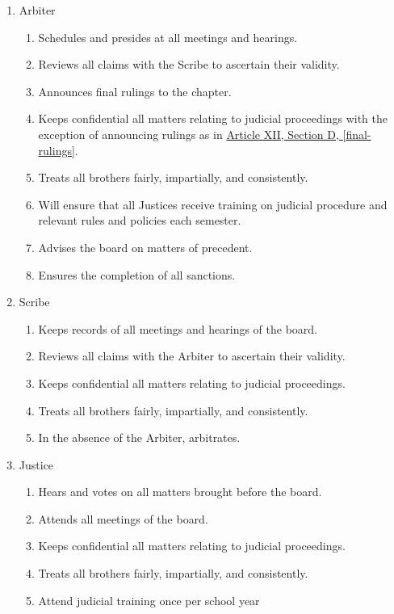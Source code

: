 	\begin{enumerate}

		\item Arbiter
			\begin{enumerate}
				\item Schedules and presides at all meetings and hearings.
				\item Reviews all claims with the Scribe to ascertain their validity.
				\item Announces final rulings to the chapter. \label{final-rulings}
				\item Keeps confidential all matters relating to judicial proceedings with the exception of announcing rulings as in \hyperref[final-rulings]{Article XII, Section D, \autoref*{final-rulings}}. 
				\item Treats all brothers fairly, impartially, and consistently.
				\item Will ensure that all Justices receive training on judicial procedure and relevant rules and policies each semester.
				\item Advises the board on matters of precedent.
				\item Ensures the completion of all sanctions.
			\end{enumerate}

		\item Scribe
			\begin{enumerate}
				\item Keeps records of all meetings and hearings of the board.
				\item Reviews all claims with the Arbiter to ascertain their validity.
				\item Keeps confidential all matters relating to judicial proceedings.
				\item Treats all brothers fairly, impartially, and consistently.
				\item In the absence of the Arbiter, arbitrates.
			\end{enumerate}

		\item Justice
			\begin{enumerate}
				\item Hears and votes on all matters brought before the board.
				\item Attends all meetings of the board.
				\item Keeps confidential all matters relating to judicial proceedings.
				\item Treats all brothers fairly, impartially, and consistently.
				\item Attend judicial training once per school year 
			\end{enumerate}


\end{enumerate}
